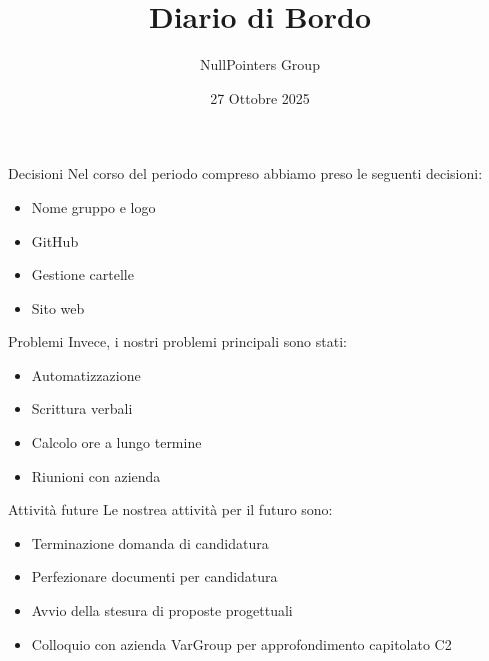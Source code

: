 \documentclass[11pt]{beamer}
\author{NullPointers Group}
\title{Diario di Bordo}
\institute{Università di Padova}
\date{27 Ottobre 2025}
\begin{document}
\begin{frame}
\titlepage
\end{frame}

\begin{frame}{Decisioni}
	Nel corso del periodo compreso abbiamo preso le seguenti decisioni:
	\begin{itemize}
		\item Nome gruppo e logo
		\item GitHub
		\item Gestione cartelle
		\item Sito web
	\end{itemize}
\end{frame}

\begin{frame}{Problemi}
	Invece, i nostri problemi principali sono stati:
	\begin{itemize}
		\item Automatizzazione
		\item Scrittura verbali
		\item Calcolo ore a lungo termine
		\item Riunioni con azienda
	\end{itemize}
\end{frame}

\begin{frame}{Attività future}
	Le nostrea attività per il futuro sono:
	\begin{itemize}
		\item Terminazione domanda di candidatura
		\item Perfezionare documenti per candidatura
		\item Avvio della stesura di proposte progettuali
		\item Colloquio con azienda VarGroup per approfondimento capitolato C2
	\end{itemize}
\end{frame}
\end{document}
